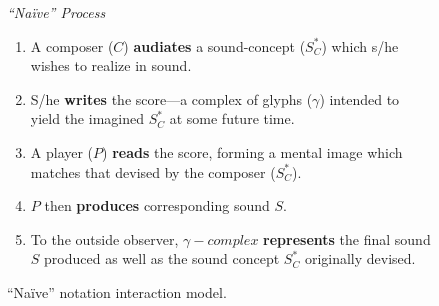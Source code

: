         \begin{figure} 
            \centering
                
                \begin{smallquote}
                    \begin{center}
                        \textit{``Naïve'' Process}
                    \end{center}
                
                    \begin{enumerate}
                        \item A composer ($C$) \textbf{audiates} a sound-concept ($S^*_C$) which s/he wishes to realize in sound.
                        \item S/he \textbf{writes} the score---a complex of glyphs ($\gamma$) intended to yield the imagined $S^*_C$ at some future time.
                        \item A player ($P$) \textbf{reads} the score, forming a mental image which matches that devised by the composer ($S^*_C$).
                        \item $P$ then \textbf{produces} corresponding sound $S$.
                        \item To the outside observer, $\gamma-complex$ \textbf{represents} the final sound $S$ produced as well as the sound concept $S^*_C$ originally devised.
                    \end{enumerate}
                \end{smallquote}

            \captionsetup{width=.5\textwidth}
            \caption{``Naïve'' notation interaction model.}
            \label{fig:naïvediagram}
        \end{figure}

